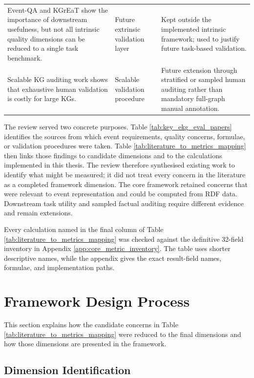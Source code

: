 \begin{table}[htbp]
\begin{tabularx}{\textwidth}{>{\raggedright\arraybackslash}p{4.0cm}>{\raggedright\arraybackslash}p{3.0cm}X}
Event-QA and KGrEaT show the importance of downstream usefulness, but not all intrinsic quality dimensions can be reduced to a single task benchmark. & Future extrinsic validation layer & Kept outside the implemented intrinsic framework; used to justify future task-based validation. \\
Scalable KG auditing work shows that exhaustive human validation is costly for large KGs. & Scalable validation procedure & Future extension through stratified or sampled human auditing rather than mandatory full-graph manual annotation. \\
\bottomrule
\end{tabularx}
\end{table}

The review served two concrete purposes. Table \ref{tab:key_ekg_eval_papers} identifies the sources from which event requirements, quality concerns, formulae, or validation procedures were taken. Table \ref{tab:literature_to_metrics_mapping} then links those findings to candidate dimensions and to the calculations implemented in this thesis. The review therefore synthesised existing work to identify what might be measured; it did not treat every concern in the literature as a completed framework dimension. The core framework retained concerns that were relevant to event representation and could be computed from RDF data. Downstream task utility and sampled factual auditing require different evidence and remain extensions.

Every calculation named in the final column of Table \ref{tab:literature_to_metrics_mapping} was checked against the definitive 32-field inventory in Appendix \ref{app:core_metric_inventory}. The table uses shorter descriptive names, while the appendix gives the exact result-field names, formulae, and implementation paths.

\section{Framework Design Process}

This section explains how the candidate concerns in Table \ref{tab:literature_to_metrics_mapping} were reduced to the final dimensions and how those dimensions are presented in the framework.

\subsection{Dimension Identification}

